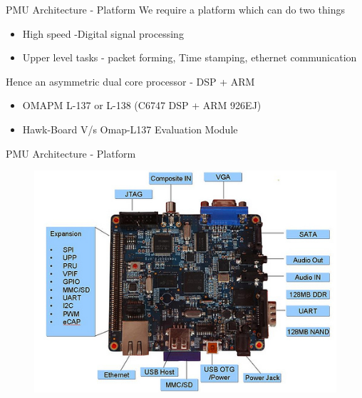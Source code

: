 \documentclass{beamer}
\begin{document}
\begin{frame}{PMU Architecture - Platform}
We require a platform which can do two things 
\begin{itemize}
\item High speed -Digital signal processing  
\item Upper level tasks - packet forming, Time stamping, ethernet communication
\end{itemize}
Hence an asymmetric dual core processor - DSP + ARM
\begin{itemize}
\item OMAPM L-137 or L-138 (C6747 DSP + ARM 926EJ)
\item Hawk-Board V/s Omap-L137 Evaluation Module
\end{itemize}
\end{frame}

\begin{frame}{PMU Architecture - Platform}
\begin{figure}
\includegraphics[scale=0.8]{fig/Hawkboard_hw.jpg}
\end{figure}
\end{frame}


\end{document}
